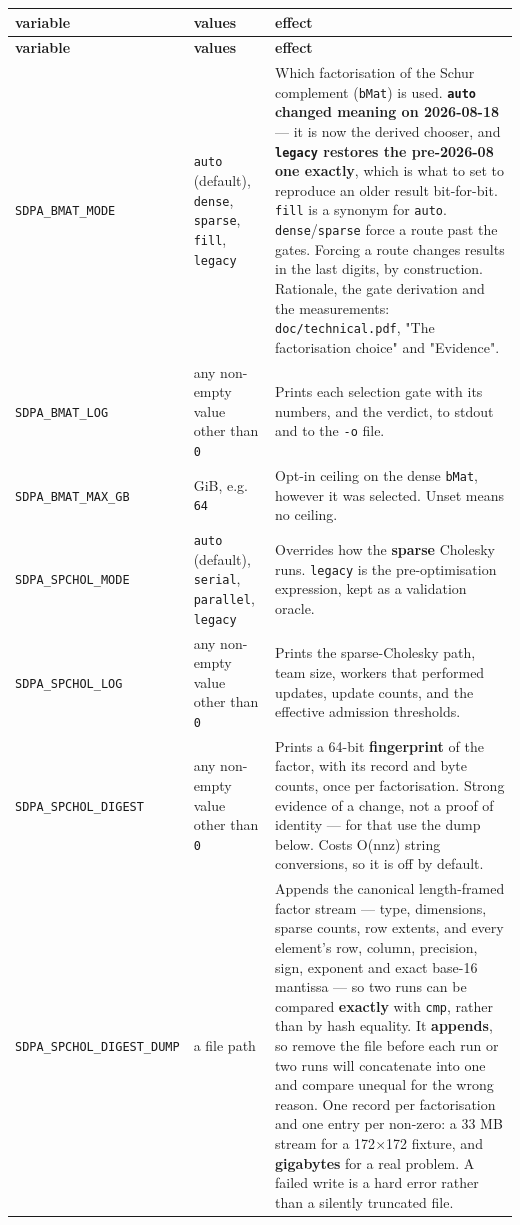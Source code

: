 \documentclass[11pt]{article}
\newcommand{\code}[1]{\texttt{#1}}
\begin{document}
\begingroup
\footnotesize
\begin{longtable}{@{}p{}p{}p{}@{}}
\toprule
\textbf{variable} & \textbf{values} & \textbf{effect} \\
\midrule
\endfirsthead
\toprule
\textbf{variable} & \textbf{values} & \textbf{effect} \\
\midrule
\endhead
\code{SDPA\_BMAT\_MODE} & \code{auto} (default), \code{dense}, \code{sparse}, \code{fill}, \code{legacy} & Which factorisation of the Schur complement (\code{bMat}) is used. \textbf{\code{auto} changed meaning on 2026-08-18} --- it is now the derived chooser, and \textbf{\code{legacy} restores the pre-2026-08 one exactly}, which is what to set to reproduce an older result bit-for-bit. \code{fill} is a synonym for \code{auto}. \code{dense}/\code{sparse} force a route past the gates. Forcing a route changes results in the last digits, by construction. Rationale, the gate derivation and the measurements: \code{doc/technical.pdf}, "The factorisation choice" and "Evidence". \\
\midrule
\code{SDPA\_BMAT\_LOG} & any non-empty value other than \code{0} & Prints each selection gate with its numbers, and the verdict, to stdout and to the \code{-o} file. \\
\midrule
\code{SDPA\_BMAT\_MAX\_GB} & GiB, e.g. \code{64} & Opt-in ceiling on the dense \code{bMat}, however it was selected. Unset means no ceiling. \\
\midrule
\code{SDPA\_SPCHOL\_MODE} & \code{auto} (default), \code{serial}, \code{parallel}, \code{legacy} & Overrides how the \textbf{sparse} Cholesky runs. \code{legacy} is the pre-optimisation expression, kept as a validation oracle. \\
\midrule
\code{SDPA\_SPCHOL\_LOG} & any non-empty value other than \code{0} & Prints the sparse-Cholesky path, team size, workers that performed updates, update counts, and the effective admission thresholds. \\
\midrule
\code{SDPA\_SPCHOL\_DIGEST} & any non-empty value other than \code{0} & Prints a 64-bit \textbf{fingerprint} of the factor, with its record and byte counts, once per factorisation. Strong evidence of a change, not a proof of identity --- for that use the dump below. Costs O(nnz) string conversions, so it is off by default. \\
\midrule
\code{SDPA\_SPCHOL\_DIGEST\_DUMP} & a file path & Appends the canonical length-framed factor stream --- type, dimensions, sparse counts, row extents, and every element's row, column, precision, sign, exponent and exact base-16 mantissa --- so two runs can be compared \textbf{exactly} with \code{cmp}, rather than by hash equality. It \textbf{appends}, so remove the file before each run or two runs will concatenate into one and compare unequal for the wrong reason. One record per factorisation and one entry per non-zero: a 33 MB stream for a 172$\times$172 fixture, and \textbf{gigabytes} for a real problem. A failed write is a hard error rather than a silently truncated file. \\

\end{longtable}
\end{document}
